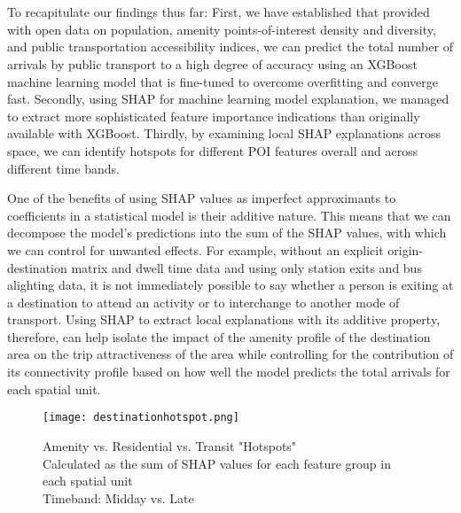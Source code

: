 \section*{}
To recapitulate our findings thus far: First, we have established that provided with open data on population, amenity points-of-interest density and diversity, and public transportation accessibility indices, we can predict the total number of arrivals by public transport to a high degree of accuracy using an XGBoost machine learning model that is fine-tuned to overcome overfitting and converge fast. Secondly, using SHAP for machine learning model explanation, we managed to extract more sophisticated feature importance indications than originally available with XGBoost. Thirdly, by examining local SHAP explanations across space, we can identify hotspots for different POI features overall and across different time bands. 

One of the benefits of using SHAP values as imperfect approximants to coefficients in a statistical model is their additive nature. This means that we can decompose the model's predictions into the sum of the SHAP values, with which we can control for unwanted effects. For example, without an explicit origin-destination matrix and dwell time data and using only station exits and bus alighting data, it is not immediately possible to say whether a person is exiting at a destination to attend an activity or to interchange to another mode of transport. Using SHAP to extract local explanations with its additive property, therefore, can help isolate the impact of the amenity profile of the destination area on the trip attractiveness of the area while controlling for the contribution of its connectivity profile based on how well the model predicts the total arrivals for each spatial unit.

\begin{figure}[!htb]
    \centering
    \texttt{[image: destinationhotspot.png]}
    \captionsetup{justification=centering}
    \caption{Amenity vs. Residential vs. Transit "Hotspots" \\Calculated as the sum of SHAP values for each feature group in each spatial unit\\Timeband: Midday vs. Late}
    \label{fig:destinationhotspot}
\end{figure}

